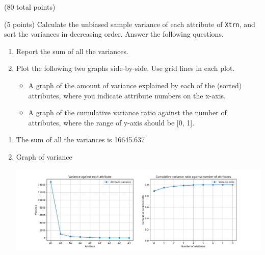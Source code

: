 \documentclass[12pt]{article}
\begin{document}
\begin{question}{(80 total points) \qOneTitle}
\begin{subquestion}{(5 points)
    Calculate the unbiased sample variance of each attribute of {\tt Xtrn}, and sort the variances in decreasing order. Answer the following questions.
  }\label{q1:variance}
  \begin{enumerate}\NARROWITEM
  \item Report the sum of all the variances.
  \item Plot the following two graphs side-by-side. Use grid lines in each plot.
    \begin{itemize}\NARROWITEM
    \item A graph of the amount of variance explained by each of the (sorted) attributes, where you indicate attribute numbers on the x-axis.
    \item A graph of the cumulative variance ratio against the number of attributes, where the range of y-axis should be [0, 1].
    \end{itemize}
  \end{enumerate}


  \begin{answerbox}{0.5\textheight}
    \begin{enumerate}
    \item The sum of all the variances is 16645.637
    \item Graph of variance
        \begin{center}
             \includegraphics[scale=0.47]{variance.pdf}
        \end{center}
    \end{enumerate}
  \end{answerbox}
  


\end{subquestion}


\end{question}
\end{document}
